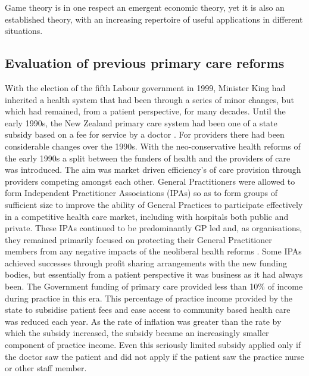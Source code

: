 \documentclass[11pt,a4paper]{article}
\begin{document}
Game theory is in one respect an emergent economic theory, yet it is also an established theory, with an increasing repertoire of useful applications in different situations. \\

\subsection{Evaluation of previous primary care reforms}
With the election of the fifth Labour government in 1999, Minister King had inherited a health system that had been through a series of minor changes, but which had remained, from a patient perspective, for many decades. Until the early 1990s, the New Zealand primary care system had been one of a state subsidy based on a fee for service by a doctor \citep{gauld2006new}. For providers there had been considerable changes over the 1990s. With the neo-conservative health reforms of the early 1990s a split between the funders of health and the providers of care was introduced. The aim was market driven efficiency's of care provision through providers competing amongst each other. General Practitioners were allowed to form Independent Practitioner Associations (IPAs) so as to form groups of sufficient size to improve the ability of General Practices to participate effectively in a competitive health care market, including with hospitals both public and private. These IPAs continued to be predominantly GP led and, as organisations, they remained primarily focused on protecting their General Practitioner members from any negative impacts of the neoliberal health reforms \citep{malcolm1999new}. Some IPAs achieved successes through profit sharing arrangements with the new funding bodies, but essentially from a patient perspective it was business as it had always been. The Government funding of primary care provided less than 10\% of income during practice in this era. This percentage of practice income provided by the state to subsidise patient fees and ease access to community based health care was reduced each year. As the rate of inflation was greater than the rate by which the subsidy increased, the subsidy became an increasingly smaller component of practice income. Even this seriously limited subsidy applied only if the doctor saw the patient and did not apply if the patient saw the practice nurse or other staff member. \\    
\end{document}

